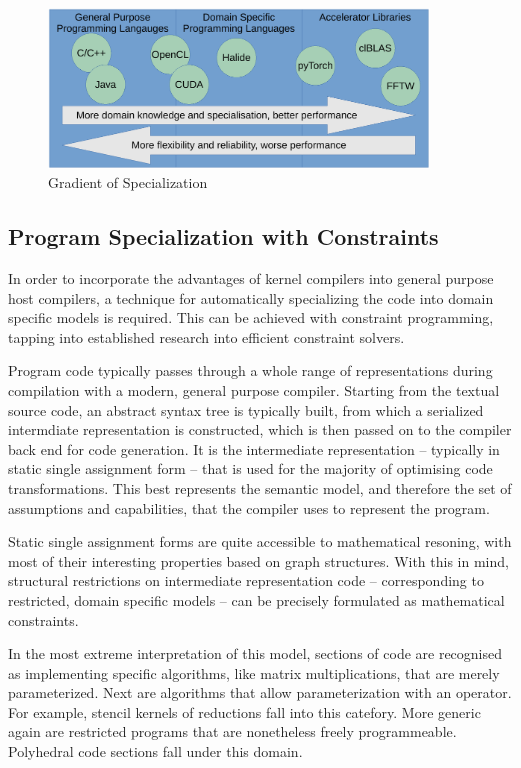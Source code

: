\begin{figure}
\includegraphics[width=0.9\textwidth]{figures/DSLgradient}
\caption{Gradient of Specialization}
\end{figure}

\subsection*{Program Specialization with Constraints}

    In order to incorporate the advantages of kernel compilers into general
    purpose host compilers, a technique for automatically specializing the code
    into domain specific models is required.
    This can be achieved with constraint programming, tapping into established
    research into efficient constraint solvers.

    Program code typically passes through a whole range of representations
    during compilation with a modern, general purpose compiler.
    Starting from the textual source code, an abstract syntax tree is typically
    built, from which a serialized intermdiate representation is constructed,
    which is then passed on to the compiler back end for code generation.
    It is the intermediate representation -- typically in static single
    assignment form -- that is used for the majority of optimising code
    transformations.
    This best represents the semantic model, and therefore the set of
    assumptions and capabilities, that the compiler uses to represent the
    program.

    Static single assignment forms are quite accessible to mathematical
    resoning, with most of their interesting properties based on graph
    structures.
    With this in mind, structural restrictions on intermediate representation
    code -- corresponding to restricted, domain specific models -- can be
    precisely formulated as mathematical constraints.

    In the most extreme interpretation of this model, sections of code are
    recognised as implementing specific algorithms, like matrix multiplications,
    that are merely parameterized.
    Next are algorithms that allow parameterization with an operator.
    For example, stencil kernels of reductions fall into this catefory.
    More generic again are restricted programs that are nonetheless freely
    programmeable.
    Polyhedral code sections fall under this domain.


